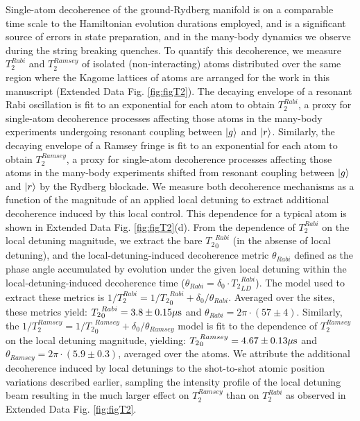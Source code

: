 \documentclass[footinbib,a4paper,aps,superscriptaddress,twocolumn,preprintnumbers,amsmath,amssymb,nobalancelastpage,10pt,prl]{revtex4-2}
\begin{document}
{Single-atom decoherence of the ground-Rydberg manifold is on a comparable time scale to the Hamiltonian evolution durations employed, and is a significant source of errors in state preparation, and in the many-body dynamics we observe during the string breaking quenches. To quantify this decoherence, we measure $T_2^{Rabi}$ and $T_2^{Ramsey}$ of isolated (non-interacting) atoms distributed over the same region where the Kagome lattices of atoms are arranged for the work in this manuscript (Extended Data Fig. \ref{fig:figT2}). The decaying envelope of a resonant Rabi oscillation is fit to an exponential for each atom to obtain $T_2^{Rabi}$, a proxy for single-atom decoherence processes affecting those atoms in the many-body experiments undergoing resonant coupling between $\ket{g}$ and $\ket{r}$. Similarly, the decaying envelope of a Ramsey fringe is fit to an exponential for each atom to obtain $T_2^{Ramsey}$, a proxy for single-atom decoherence processes affecting those atoms in the many-body experiments shifted from resonant coupling between $\ket{g}$ and $\ket{r}$ by the Rydberg blockade. We measure both decoherence mechanisms as a function of the magnitude of an applied local detuning to extract additional decoherence induced by this local control. This dependence for a typical atom is shown in Extended Data Fig. \ref{fig:figT2}(d). From the dependence of $T_2^{Rabi}$ on the local detuning magnitude, we extract the bare ${T_2}_0^{Rabi}$ (in the absense of local detuning), and the local-detuning-induced decoherence metric $\theta_{Rabi}$ defined as the phase angle accumulated by evolution under the given local detuning within the local-detuning-induced decoherence time ($\theta_{Rabi} = \delta_{0}\cdot {T_2}_{LD}^{Rabi}$).  The model used to extract these metrics is $1/T_2^{Rabi} = 1/{T_2}_0^{Rabi} + \delta_{0}/\theta_{Rabi}$. Averaged over the sites, these metrics yield: ${T_2}_0^{Rabi} = 3.8 \pm 0.15{\rm \mu s}$ and $\theta_{Rabi} = 2\pi\cdot(57 \pm 4)$. Similarly, the $1/T_2^{Ramsey} = 1/{T_2}_0^{Ramsey} + \delta_{0}/\theta_{Ramsey}$ model is fit to the dependence of $T_2^{Ramsey}$ on the local detuning magnitude, yielding: ${T_2}_0^{Ramsey} = 4.67 \pm 0.13{\rm \mu s}$ and $\theta_{Ramsey} = 2\pi\cdot(5.9 \pm 0.3)$, averaged over the atoms. We attribute the additional decoherence induced by local detunings to the shot-to-shot atomic position variations described earlier, sampling the intensity profile of the local detuning beam resulting in the much larger effect on $T_2^{Ramsey}$ than on $T_2^{Rabi}$ as observed in Extended Data Fig. \ref{fig:figT2}.

}
\end{document}
